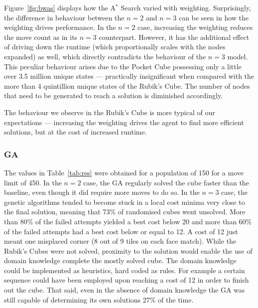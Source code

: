 \documentclass[UKenglish]{svproc}
\begin{document}
Figure~\ref{fig:bwas} displays how the A$^{\ast}$ Search varied with weighting. Surprisingly, the difference in behaviour between the $n=2$ and $n=3$ can be seen in how the weighting drives performance. In the $n=2$ case, increasing the weighting reduces the move count as in its $n=3$ counterpart. However, it has the additional effect of driving down the runtime (which proportionally scales with the nodes expanded) as well, which directly contradicts the behaviour of the $n=3$ model. This peculiar behaviour arises due to the Pocket Cube possessing only a little over 3.5 million unique states --- practically insignificant when compared with the more than 4 quintillion unique states of the Rubik's Cube. The number of nodes that need to be generated to reach a solution is diminished accordingly.

The behaviour we observe in the Rubik's Cube is more typical of our expectations --- increasing the weighting drives the agent to find more efficient solutions, but at the cost of increased runtime.

\subsubsection{GA}
The values in Table~\ref{tab:res} were obtained for a population of 150 for a move limit of 450.
In the $n=2$ case, the GA regularly solved the cube faster than the baseline, even though it did require more moves to do so. In the $n=3$ case, the genetic algorithms tended to become stuck in a local cost minima very close to the final solution, meaning that 73\% of randomised cubes went unsolved. More than 80\% of the failed attempts yielded a best cost below 20 and more than 60\% of the failed attempts had a best cost below or equal to 12. A cost of 12 just meant one misplaced corner (8 out of 9 tiles on each face match).
While the Rubik's Cubes were not solved, proximity to the solution would enable the use of domain knowledge complete the mostly solved cube. The domain knowledge could be implemented as heuristics, hard coded as rules. For example a certain sequence could have been employed upon reaching a cost of 12 in order to finish out the cube. That said, even in the absence of domain knowledge the GA was still capable of determining its own solutions 27\% of the time.
\end{document}
